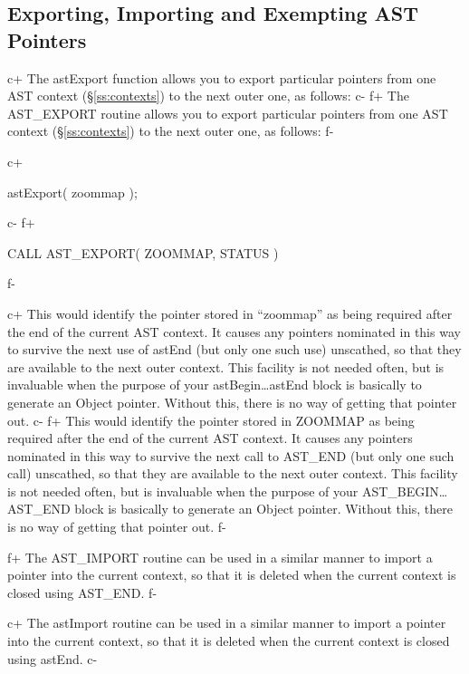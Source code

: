 \documentclass[twoside,11pt]{starlink}
\providecommand{\secref}[1]{\S\ref{#1}}
\begin{document}
\subsection{Exporting, Importing and Exempting AST Pointers}
c+
The astExport function allows you to export particular pointers from
one AST context (\secref{ss:contexts}) to the next outer one, as
follows:
c-
f+
The AST\_EXPORT routine allows you to export particular pointers from
one AST context (\secref{ss:contexts}) to the next outer one, as
follows:
f-

c+
\small
\begin{terminalv}
astExport( zoommap );
\end{terminalv}
\normalsize
c-
f+
\small
\begin{terminalv}
      CALL AST_EXPORT( ZOOMMAP, STATUS )
\end{terminalv}
\normalsize
f-

c+
This would identify the pointer stored in ``zoommap'' as being required
after the end of the current AST context. It causes any pointers
nominated in this way to survive the next use of astEnd (but only one
such use) unscathed, so that they are available to the next outer
context.  This facility is not needed often, but is invaluable when
the purpose of your astBegin\ldots astEnd block is basically to
generate an Object pointer. Without this, there is no way of getting
that pointer out.
c-
f+
This would identify the pointer stored in ZOOMMAP as being required after
the end of the current AST context. It causes any pointers nominated
in this way to survive the next call to AST\_END (but only one such
call) unscathed, so that they are available to the next outer context.
This facility is not needed often, but is invaluable when the purpose
of your AST\_BEGIN\ldots AST\_END block is basically to generate an
Object pointer. Without this, there is no way of getting that pointer
out.
f-

f+
The AST\_IMPORT routine can be used in a similar manner to import a
pointer into the current context, so that it is deleted when the current
context is closed using AST\_END.
f-

c+
The astImport routine can be used in a similar manner to import a
pointer into the current context, so that it is deleted when the current
context is closed using astEnd.
c-
\end{document}
